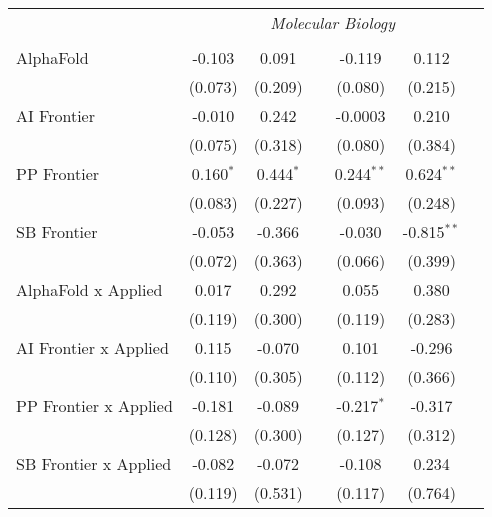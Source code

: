 \begin{tabular}{lcccccc}
 & \multicolumn{6}{c}{\textit{Molecular Biology}} \\ \\
   AlphaFold                      & -0.103      & 0.091       &               & -0.119       & 0.112         &   \\   
                                  & (0.073)     & (0.209)     &               & (0.080)      & (0.215)       &   \\   
   AI Frontier                    & -0.010      & 0.242       &               & -0.0003      & 0.210         &   \\   
                                  & (0.075)     & (0.318)     &               & (0.080)      & (0.384)       &   \\   
   PP Frontier                    & 0.160$^{*}$ & 0.444$^{*}$ &               & 0.244$^{**}$ & 0.624$^{**}$  &   \\   
                                  & (0.083)     & (0.227)     &               & (0.093)      & (0.248)       &   \\   
   SB Frontier                    & -0.053      & -0.366      &               & -0.030       & -0.815$^{**}$ &   \\   
                                  & (0.072)     & (0.363)     &               & (0.066)      & (0.399)       &   \\   
   AlphaFold x Applied            & 0.017       & 0.292       &               & 0.055        & 0.380         &   \\   
                                  & (0.119)     & (0.300)     &               & (0.119)      & (0.283)       &   \\   
   AI Frontier x Applied          & 0.115       & -0.070      &               & 0.101        & -0.296        &   \\   
                                  & (0.110)     & (0.305)     &               & (0.112)      & (0.366)       &   \\   
   PP Frontier x Applied          & -0.181      & -0.089      &               & -0.217$^{*}$ & -0.317        &   \\   
                                  & (0.128)     & (0.300)     &               & (0.127)      & (0.312)       &   \\   
   SB Frontier x Applied          & -0.082      & -0.072      &               & -0.108       & 0.234         &   \\   
                                  & (0.119)     & (0.531)     &               & (0.117)      & (0.764)       &   \\   

\end{tabular}

